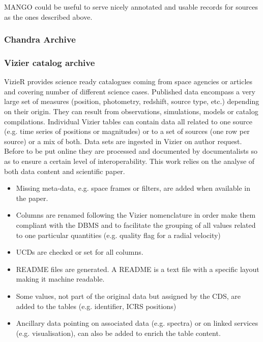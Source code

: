\documentclass[11pt,a4paper]{ivoa}
\begin{document}
MANGO could be useful to serve nicely annotated and usable records for
sources as the ones described above.

\pagebreak
\subsubsection{Chandra Archive}


\pagebreak
\subsubsection{Vizier catalog archive  }

%
VizieR provides science ready catalogues coming from space agencies or articles and covering number of different science cases.
Published data encompass a very large set of measures (position, photometry, redshift, source type, etc.) depending on their origin.
They can result from  observations, simulations, models or catalog compilations.
Individual Vizier tables can contain data all related to one source (e.g. time series of positions or magnitudes) or to a set of sources (one row per source) or a mix of both.
%
Data sets are ingested in Vizier on author request. Before to be put online they are processed and documented by documentalists so as to ensure a certain level of interoperability.
This work relies on the analyse of both data content and scientific paper.
\begin{itemize}
\item Missing meta-data, e.g. space frames or filters, are added when available in the paper.
\item Columns are renamed following the Vizier nomenclature in order make them compliant with the DBMS and to facilitate the grouping of all values related to one particular quantities (e.g. quality flag for a radial velocity)
\item UCDs are checked or set for all columns.
\item README files are generated. A README is a text file with a specific layout making it machine readable.
\item Some values, not part of the original data but assigned by the CDS, are added to the tables (e.g. identifier, ICRS positions)
\item Ancillary data pointing on associated data (e.g.  spectra) or on linked services (e.g. visualisation), can also be added to enrich the table content.
\end{itemize}
\end{document}
